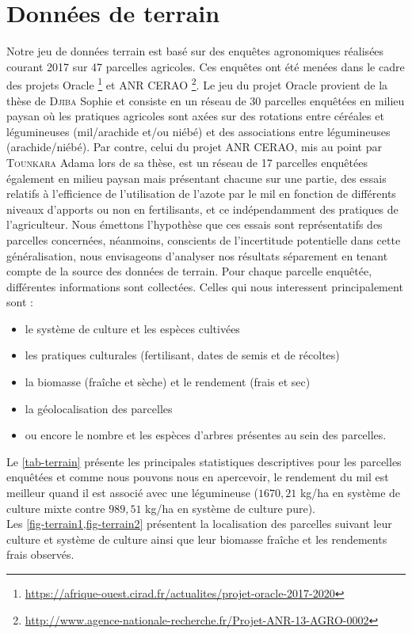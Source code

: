 \section{Données de terrain}

Notre jeu de données terrain est basé sur des enquêtes agronomiques réalisées courant 2017 sur 47 parcelles agricoles. Ces enquêtes ont été menées dans le cadre des projets Oracle \footnote{\url{https://afrique-ouest.cirad.fr/actualites/projet-oracle-2017-2020}} et ANR CERAO \footnote{\url{http://www.agence-nationale-recherche.fr/Projet-ANR-13-AGRO-0002}}. Le jeu du projet Oracle provient de la thèse de \textsc{Djiba} Sophie et consiste en un réseau de 30 parcelles enquêtées en milieu paysan où les pratiques agricoles sont 
axées sur des rotations entre céréales et légumineuses (mil/arachide et/ou niébé) et des associations entre légumineuses (arachide/niébé). Par contre, celui du projet ANR CERAO, mis au point par \textsc{Tounkara} Adama lors de sa thèse, est un réseau de 17 parcelles enquêtées également en milieu paysan mais présentant chacune sur une partie, des essais relatifs à l'efficience de l'utilisation de l'azote par le mil en fonction de différents niveaux d'apports ou non en fertilisants, et ce indépendamment des pratiques de l'agriculteur. Nous émettons l'hypothèse que ces essais sont représentatifs des parcelles concernées, néanmoins, conscients de l'incertitude potentielle dans cette généralisation, nous envisageons d'analyser nos résultats séparement en tenant compte de la source des données de terrain. Pour chaque parcelle enquêtée, différentes informations sont collectées. Celles qui nous interessent principalement sont :
\begin{itemize}
 \item le système de culture et les espèces cultivées
 \item les pratiques culturales (fertilisant, dates de semis et de récoltes)
 \item la biomasse (fraîche et sèche) et le rendement (frais et sec)
 \item la géolocalisation des parcelles
 \item ou encore le nombre et les espèces d'arbres présentes au sein des parcelles.
\end{itemize}
Le \cref{tab-terrain} présente les principales statistiques descriptives pour les parcelles enquêtées et comme nous pouvons nous en apercevoir, le rendement du mil est meilleur quand il est associé avec une légumineuse ($1670,21$ \si[per-mode=symbol]
{\kilogram\per\hectare} en système de culture mixte contre $989,51$ \si[per-mode=symbol]
{\kilogram\per\hectare} en système de culture pure).
\\Les \cref{fig-terrain1,fig-terrain2} présentent la localisation des parcelles suivant leur culture et système de culture ainsi que leur biomasse fraîche et les rendements frais observés.

